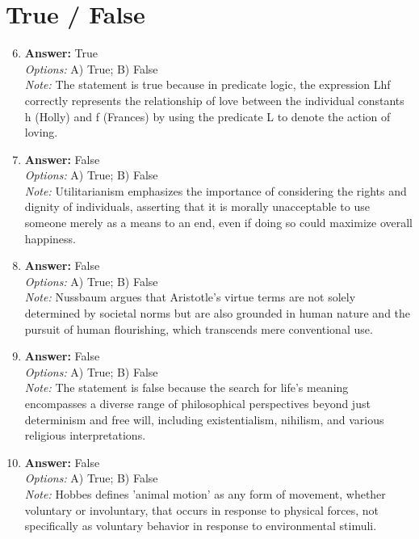 \documentclass[12pt]{article}
\begin{document}
\section*{True / False}
\begin{enumerate}[label=\arabic*.]
\setcounter{enumi}{5}
\item \textbf{Answer:} True
\\ \textit{Options:} A) True; B) False
\\ \textit{Note:} The statement is true because in predicate logic, the expression Lhf correctly represents the relationship of love between the individual constants h (Holly) and f (Frances) by using the predicate L to denote the action of loving.
\item \textbf{Answer:} False
\\ \textit{Options:} A) True; B) False
\\ \textit{Note:} Utilitarianism emphasizes the importance of considering the rights and dignity of individuals, asserting that it is morally unacceptable to use someone merely as a means to an end, even if doing so could maximize overall happiness.
\item \textbf{Answer:} False
\\ \textit{Options:} A) True; B) False
\\ \textit{Note:} Nussbaum argues that Aristotle's virtue terms are not solely determined by societal norms but are also grounded in human nature and the pursuit of human flourishing, which transcends mere conventional use.
\item \textbf{Answer:} False
\\ \textit{Options:} A) True; B) False
\\ \textit{Note:} The statement is false because the search for life's meaning encompasses a diverse range of philosophical perspectives beyond just determinism and free will, including existentialism, nihilism, and various religious interpretations.
\item \textbf{Answer:} False
\\ \textit{Options:} A) True; B) False
\\ \textit{Note:} Hobbes defines 'animal motion' as any form of movement, whether voluntary or involuntary, that occurs in response to physical forces, not specifically as voluntary behavior in response to environmental stimuli.
\end{enumerate}
\end{document}
